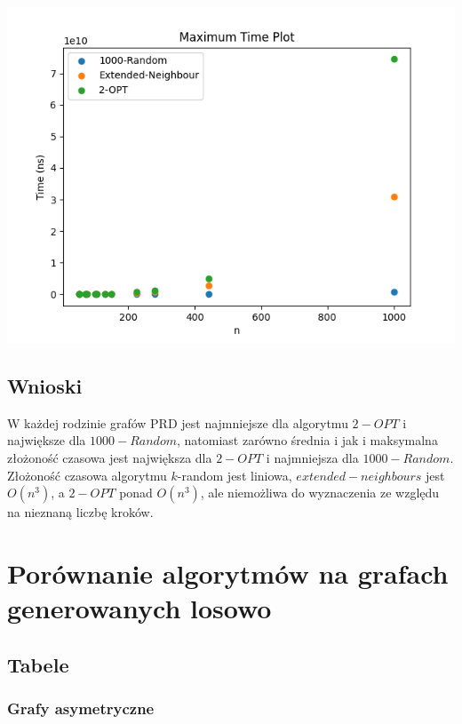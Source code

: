 \documentclass{article}
\begin{document}
\begin{center}
\includegraphics[width=\textwidth, 
                   height = 0.4\textheight, 
                   keepaspectratio]
                  {tsp_lib_max_time} 
\end{center}

\subsection{Wnioski}
W każdej rodzinie grafów PRD jest najmniejsze dla algorytmu $2-OPT$ i największe dla $1000-Random$, natomiast zarówno średnia i jak i maksymalna złożoność czasowa jest największa dla $2-OPT$ i najmniejsza dla $1000-Random$. Złożoność czasowa algorytmu $k$-random jest liniowa, $extended-neighbours$ jest $O(n^3)$, a $2-OPT$ ponad $O(n^3)$, ale niemożliwa do wyznaczenia ze względu na nieznaną liczbę kroków.


\section{Porównanie algorytmów na grafach generowanych losowo}
\subsection{Tabele}

\subsubsection{Grafy asymetryczne}
\end{document}
